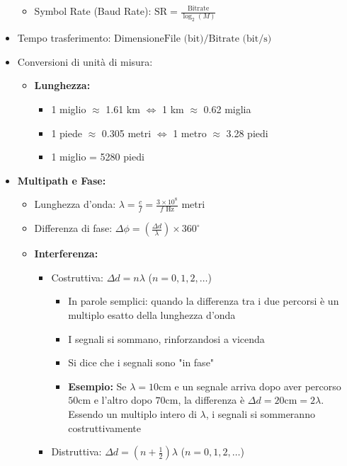 \begin{itemize}
\begin{itemize}
        \item Symbol Rate (Baud Rate): $\text{SR} = \frac{\text{Bitrate}}{\log_2(M)}$
    \end{itemize}
    \item Tempo trasferimento: $\text{DimensioneFile (bit)} / \text{Bitrate (bit/s)}$
    \item Conversioni di unità di misura:
    \begin{itemize}
        \item \textbf{Lunghezza:}
        \begin{itemize}
            \item 1 miglio $\approx$ 1.61 km $\Longleftrightarrow$ 1 km $\approx$ 0.62 miglia
            \item 1 piede $\approx$ 0.305 metri $\Longleftrightarrow$ 1 metro $\approx$ 3.28 piedi
            \item 1 miglio = 5280 piedi
        \end{itemize}
    \end{itemize}
    \item \textbf{Multipath e Fase:}
    \begin{itemize}
        \item Lunghezza d'onda: $\lambda = \frac{c}{f} = \frac{3 \times 10^8}{f \text{ Hz}}$ metri
        \item Differenza di fase: $\Delta\phi = \left( \frac{\Delta d}{\lambda} \right) \times 360^\circ$
        \item \textbf{Interferenza:}
        \begin{itemize}
            \item Costruttiva: $\Delta d = n\lambda$ ($n = 0,1,2,\ldots$)
            \begin{itemize}
                \item In parole semplici: quando la differenza tra i due percorsi è un multiplo esatto della lunghezza d'onda
                \item I segnali si sommano, rinforzandosi a vicenda
                \item Si dice che i segnali sono "in fase"
                \item \textbf{Esempio:} Se $\lambda = 10\text{cm}$ e un segnale arriva dopo aver percorso $50\text{cm}$ e l'altro dopo $70\text{cm}$, la differenza è $\Delta d = 20\text{cm} = 2\lambda$. Essendo un multiplo intero di $\lambda$, i segnali si sommeranno costruttivamente
            \end{itemize}
            \item Distruttiva: $\Delta d = (n + \frac{1}{2})\lambda$ ($n = 0,1,2,\ldots$)

\end{itemize}
\end{itemize}
\end{itemize}
